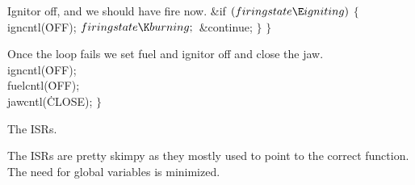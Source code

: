 Ignitor off, and we should have fire now.
\Y\B\&{if} ${}(\\{firingstate}\E\\{igniting}){}$\5
${}\{{}$\1\6
\\{igncntl}(\.{OFF});\6
${}\\{firingstate}\K\\{burning};{}$\6
\&{continue};\6
\4${}\}{}$\2\6
$\}{}$\par
\fi

Once the loop fails we set fuel and ignitor off and close the jaw.
\Y\B\\{igncntl}(\.{OFF});\6
\\{fuelcntl}(\.{OFF});\6
\\{jawcntl}(\.{CLOSE}); $\}{}$\par
\fi

The ISRs.

The ISRs are pretty skimpy as they mostly used to point 
to
the correct function.
The need for global variables is minimized.

\fi


